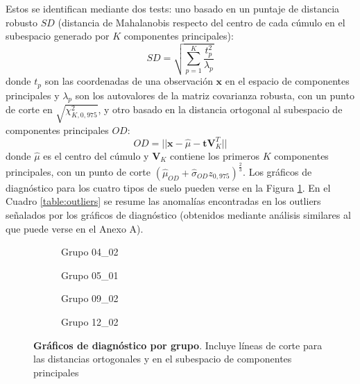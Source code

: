 \documentclass[12pt]{article}
\begin{document}
Estos se identifican mediante dos tests: uno basado en un puntaje de distancia robusto $SD$ (distancia de Mahalanobis respecto del centro de cada cúmulo en el subespacio generado por $K$ componentes principales): 
\begin{equation}
SD = \sqrt{\sum_{p = 1}^K \frac{t_p^2}{\lambda_p}}    
\end{equation} 
donde $t_p$ son las coordenadas de una observación $\mathbf{x}$ en el espacio de componentes principales y $\lambda_p$ son los autovalores de la matriz covarianza robusta, con un punto de corte en $\sqrt{\chi_{K,0,975}^2}$,  y otro basado en la distancia ortogonal al subespacio de componentes principales $OD$:
\begin{equation}
OD = ||\mathbf{x} - \hat{\mu} - \mathbf{t} \mathbf{V}^T_K||    
\end{equation}
donde $\hat{\mu}$ es el centro del cúmulo y $\mathbf{V}_K$ contiene los primeros $K$ componentes principales, con un punto de corte $(\hat{\mu}_{OD} + \hat{\sigma}_{OD} z_{0,975})^{\frac{2}{3}}$. Los gráficos de diagnóstico para los cuatro tipos de suelo pueden verse en la Figura \ref{fig:diag}. En el Cuadro \ref{table:outliers} se resume las anomalías encontradas en los outliers señalados por los gráficos de diagnóstico (obtenidos mediante análisis similares al que puede verse en el Anexo A).

\begin{figure}[htbp]
    \centering
    \begin{subfigure}[b]{0.45\textwidth}
        \caption{Grupo 04\_02}
        
    \end{subfigure}
    \begin{subfigure}[b]{0.45\textwidth}
        \caption{Grupo 05\_01}
        
    \end{subfigure}
    \begin{subfigure}[b]{0.45\textwidth}
        \caption{Grupo 09\_02}
        
    \end{subfigure}
    \begin{subfigure}[b]{0.45\textwidth}
        \caption{Grupo 12\_02}
        
    \end{subfigure}
    \caption{\textbf{Gráficos de diagnóstico por grupo}. Incluye líneas de corte para las distancias ortogonales y en el subespacio de componentes principales}  
    \label{fig:diag}
\end{figure}
\end{document}
